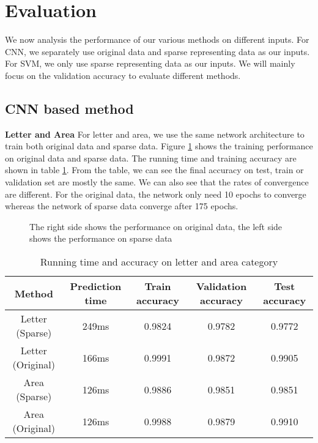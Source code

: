 
\section{Evaluation}
We now analysis the performance of our various methods on different inputs. 
For CNN, we separately use original data and sparse representing data as our inputs.
For SVM, we only use sparse representing data as our inputs. 
We will mainly focus on the validation accuracy to evaluate different methods.

\subsection{CNN based method}
\textbf{Letter and Area} 
For letter and area, we use the same network architecture to train both original data and sparse data.
Figure \ref{letter} shows the training performance on original data and sparse data. 
The running time and training accuracy are shown in table \ref{label1}. 
From the table, we can see the final accuracy on test, train or validation set are mostly the same.
We can also see that the rates of convergence are different. 
For the original data, the network only need 10 epochs to converge 
whereas the network of sparse data converge after 175 epochs.

\begin{figure}[ht]
\centering
{}
\qquad
{}
\qquad
{}
\qquad
{}
\qquad
{}
\qquad
{}
\qquad
{}
\qquad
{}
\qquad
\caption{The right side shows the performance on original data, the left side shows the performance on sparse data}
\label{letter}
\end{figure}

\begin{table}[ht]
\centering
\scalebox{0.70} {
    \begin{tabular}{|c|c|c|c|c|}
        \hline
        Method&Prediction time&Train accuracy&Validation accuracy&Test accuracy\\
        \hline
        Letter (Sparse)&249ms&0.9824&0.9782&0.9772\\
        \hline
        Letter (Original)&166ms&0.9991&0.9872&0.9905\\
        \hline
        Area (Sparse)&126ms&0.9886&0.9851&0.9851\\
        \hline
        Area (Original)&126ms&0.9988&0.9879&0.9910\\
        \hline
    \end{tabular}
}
\caption{Running time and accuracy on letter and area category}
\label{label1}
\end{table}


